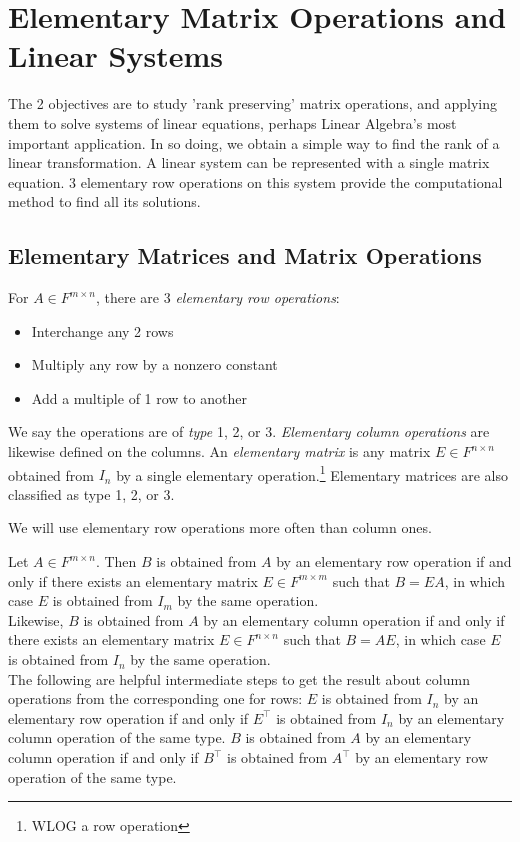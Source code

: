 \chapter{Elementary Matrix Operations and Linear Systems}
The 2 objectives are to study 'rank preserving' matrix operations, and applying them to solve systems of linear equations, perhaps Linear Algebra's most important application. In so doing, we obtain a simple way to find the rank of a linear transformation.
A linear system can be represented with a single matrix equation. 3 elementary row operations on this system provide the computational method to find all its solutions.

\section{Elementary Matrices and Matrix Operations}
\begin{defn}
For $A \in F^{m \times n}$, there are 3 \emph{elementary row operations}:
\begin{itemize}
\item Interchange any 2 rows
\item Multiply any row by a nonzero constant
\item Add a multiple of 1 row to another
\end{itemize}
We say the operations are of \emph{type} 1, 2, or 3. \emph{Elementary column operations} are likewise defined on the columns. An \emph{elementary matrix} is any matrix $E \in F^{n \times n}$ obtained from $I_n$ by a single elementary operation.\footnote{WLOG a row operation} Elementary matrices are also classified as type 1, 2, or 3.
\end{defn}
We will use elementary row operations more often than column ones.
\begin{lem}\label{l:ero}
Let $A \in F^{m \times n}$. Then $B$ is obtained from $A$ by an elementary row operation if and only if there exists an elementary matrix $E \in F^{m \times m}$ such that $B=EA$, in which case $E$ is obtained from $I_m$ by the same operation.\\
Likewise, $B$ is obtained from $A$ by an elementary column operation if and only if there exists an elementary matrix $E \in F^{n \times n}$ such that $B=AE$, in which case $E$ is obtained from $I_n$ by the same operation.\\
The following are helpful intermediate steps to get the result about column operations from the corresponding one for rows: $E$ is obtained from $I_n$ by an elementary row operation if and only if $E^\top$ is obtained from $I_n$ by an elementary column operation of the same type. $B$ is obtained from $A$ by an elementary column operation if and only if $B^\top$ is obtained from $A^\top$ by an elementary row operation of the same type.
\end{lem}
